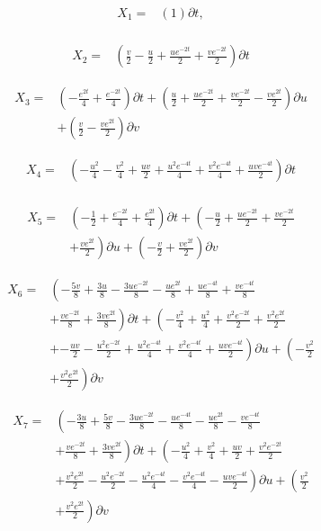 \begin{align*}
X_{1}=&\left(1 \right)\partial t,\\
\end{align*}

\begin{align*}
X_{2}=&\left(\frac{v}{2}- \frac{u}{2}+\frac{u e^{- 2 t}}{2}+\frac{v e^{- 2 t}}{2} \right)\partial t
\end{align*}

\begin{align*}
X_{3}=&\left(- \frac{e^{2 t}}{4}+\frac{e^{- 2 t}}{4} \right)\partial t+\left(\frac{u}{2}+\frac{u e^{- 2 t}}{2}+\frac{v e^{- 2 t}}{2}- \frac{v e^{2 t}}{2} \right)\partial u\\
&+\left(\frac{v}{2}- \frac{v e^{2 t}}{2} \right)\partial v
\end{align*}

\begin{align*}
X_{4}=&\left(- \frac{u^{2}}{4}- \frac{v^{2}}{4}+\frac{u v}{2}+\frac{u^{2} e^{- 4 t}}{4}+\frac{v^{2} e^{- 4 t}}{4}+\frac{u v e^{- 4 t}}{2} \right)\partial t\\
\end{align*}

\begin{align*}
X_{5}=&\left(- \frac{1}{2}+\frac{e^{- 2 t}}{4}+\frac{e^{2 t}}{4} \right)\partial t+\left(- \frac{u}{2}+\frac{u e^{- 2 t}}{2}+\frac{v e^{- 2 t}}{2}\right.\\
&+\left.\frac{v e^{2 t}}{2} \right)\partial u+\left(- \frac{v}{2}+\frac{v e^{2 t}}{2} \right)\partial v
\end{align*}

\begin{align*}
X_{6}=&\left(- \frac{5 v}{8}+\frac{3 u}{8}- \frac{3 u e^{- 2 t}}{8}- \frac{u e^{2 t}}{8}+\frac{u e^{- 4 t}}{8}+\frac{v e^{- 4 t}}{8}\right.\\
&+\left.\frac{v e^{- 2 t}}{8}+\frac{3 v e^{2 t}}{8} \right)\partial t+\left(- \frac{v^{2}}{4}+\frac{u^{2}}{4}+\frac{v^{2} e^{- 2 t}}{2}+\frac{v^{2} e^{2 t}}{2}\right.\\
&+\left.- \frac{u v}{2}- \frac{u^{2} e^{- 2 t}}{2}+\frac{u^{2} e^{- 4 t}}{4}+\frac{v^{2} e^{- 4 t}}{4}+\frac{u v e^{- 4 t}}{2} \right)\partial u+\left(- \frac{v^{2}}{2}\right.\\
&+\left.\frac{v^{2} e^{2 t}}{2} \right)\partial v
\end{align*}

\begin{align*}
X_{7}=&\left(- \frac{3 u}{8}+\frac{5 v}{8}- \frac{3 u e^{- 2 t}}{8}- \frac{u e^{- 4 t}}{8}- \frac{u e^{2 t}}{8}- \frac{v e^{- 4 t}}{8}\right.\\
&+\left.\frac{v e^{- 2 t}}{8}+\frac{3 v e^{2 t}}{8} \right)\partial t+\left(- \frac{u^{2}}{4}+\frac{v^{2}}{4}+\frac{u v}{2}+\frac{v^{2} e^{- 2 t}}{2}\right.\\
&+\left.\frac{v^{2} e^{2 t}}{2}- \frac{u^{2} e^{- 2 t}}{2}- \frac{u^{2} e^{- 4 t}}{4}- \frac{v^{2} e^{- 4 t}}{4}- \frac{u v e^{- 4 t}}{2} \right)\partial u+\left(\frac{v^{2}}{2}\right.\\
&+\left.\frac{v^{2} e^{2 t}}{2} \right)\partial v
\end{align*}

